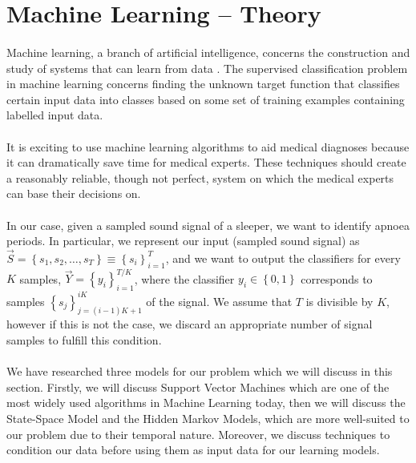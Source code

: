 \section{Machine Learning -- Theory}

\paragraph{}
	Machine learning, a branch of artificial intelligence, concerns the construction and study of systems that can learn from data \cite{wiki:machineLearning}. The supervised classification problem in machine learning concerns finding the unknown target function that classifies certain input data into classes based on some set of training examples containing labelled input data.

\paragraph{}
	It is exciting to use machine learning algorithms to aid medical diagnoses because it can dramatically save time for medical experts. These techniques should create a reasonably reliable, though not perfect, system on which the medical experts can base their decisions on.
	
\paragraph{}
	In our case, given a sampled sound signal of a sleeper, we want to identify apnoea periods. In particular, we represent our input (sampled sound signal) as $\vec S = \left\{s_1, s_2, \dotsc, s_T \right\} \equiv \left\{ s_i \right\}_{i = 1}^{T}$, and we want to output the classifiers for every $K$ samples, $\vec Y = \left\{ y_i \right\}_{i = 1}^{T/K}$, where the classifier $y_i \in \left\{0, 1\right\}$ corresponds to samples $\left\{ s_j \right\}_{j = \left(i - 1\right)K + 1}^{iK}$ of the signal. We assume that $T$ is divisible by $K$, however if this is not the case, we discard an appropriate number of signal samples to fulfill this condition.
	
\paragraph{}
	We have researched three models for our problem which we will discuss in this section. Firstly, we will discuss Support Vector Machines which are one of the most widely used algorithms in Machine Learning today, then we will discuss the State-Space Model and the Hidden Markov Models, which are more well-suited to our problem due to their temporal nature. Moreover, we discuss techniques to condition our data before using them as input data for our learning models.
	



